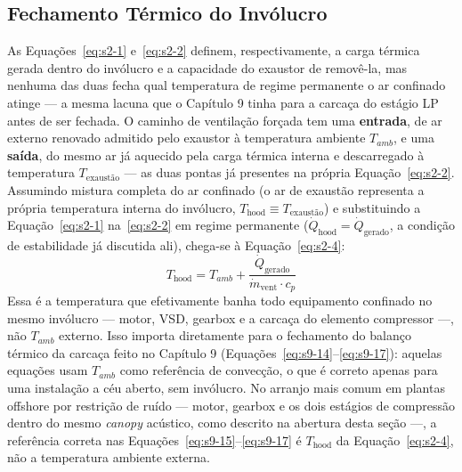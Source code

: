 \documentclass[12pt,a4paper]{article}
\numberwithin{equation}{section}
\numberwithin{table}{section}
\numberwithin{figure}{section}
\begin{document}
{	\subsection{\textbf{Fechamento Térmico do Invólucro}}
	As Equações~\eqref{eq:s2-1} e~\eqref{eq:s2-2} definem, respectivamente, a carga térmica gerada dentro do invólucro e a capacidade do exaustor de removê-la, mas nenhuma das duas fecha qual temperatura de regime permanente o ar confinado atinge — a mesma lacuna que o Capítulo 9 tinha para a carcaça do estágio LP antes de ser fechada. O caminho de ventilação forçada tem uma \textbf{entrada}, de ar externo renovado admitido pelo exaustor à temperatura ambiente $T_{amb}$, e uma \textbf{saída}, do mesmo ar já aquecido pela carga térmica interna e descarregado à temperatura $T_{\text{exaustão}}$ — as duas pontas já presentes na própria Equação~\eqref{eq:s2-2}. Assumindo mistura completa do ar confinado (o ar de exaustão representa a própria temperatura interna do invólucro, $T_{\text{hood}} \equiv T_{\text{exaustão}}$) e substituindo a Equação~\eqref{eq:s2-1} na~\eqref{eq:s2-2} em regime permanente ($\dot Q_{\text{hood}} = \dot Q_{\text{gerado}}$, a condição de estabilidade já discutida ali), chega-se à Equação~\eqref{eq:s2-4}:
	\begin{equation}\label{eq:s2-4}
 T_{\text{hood}} = T_{amb} + \frac{\dot{Q}_{\text{gerado}}}{\dot{m}_{\text{vent}} \cdot c_p}
\end{equation}
	Essa é a temperatura que efetivamente banha todo equipamento confinado no mesmo invólucro — motor, VSD, gearbox e a carcaça do elemento compressor —, não $T_{amb}$ externo. Isso importa diretamente para o fechamento do balanço térmico da carcaça feito no Capítulo 9 (Equações~\eqref{eq:s9-14}--\eqref{eq:s9-17}): aquelas equações usam $T_{amb}$ como referência de convecção, o que é correto apenas para uma instalação a céu aberto, sem invólucro. No arranjo mais comum em plantas offshore por restrição de ruído — motor, gearbox e os dois estágios de compressão dentro do mesmo \textit{canopy} acústico, como descrito na abertura desta seção —, a referência correta nas Equações~\eqref{eq:s9-15}--\eqref{eq:s9-17} é $T_{\text{hood}}$ da Equação~\eqref{eq:s2-4}, não a temperatura ambiente externa.

}
\end{document}

